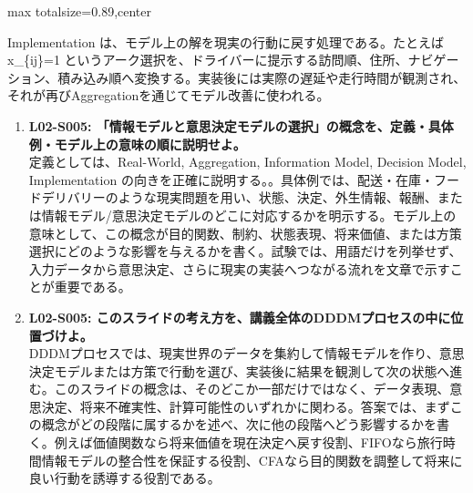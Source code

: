 \begin{minipage}[t]{0.58\textwidth}
\begin{adjustbox}{max totalsize={\textwidth}{0.89\textheight},center}
\begin{minipage}{\textwidth}
Implementation は、モデル上の解を現実の行動に戻す処理である。たとえば x\_\{ij\}=1 というアーク選択を、ドライバーに提示する訪問順、住所、ナビゲーション、積み込み順へ変換する。実装後には実際の遅延や走行時間が観測され、それが再びAggregationを通じてモデル改善に使われる。\par{}\begin{enumerate}\item \textbf{L02-S005: 「情報モデルと意思決定モデルの選択」の概念を、定義・具体例・モデル上の意味の順に説明せよ。}\\定義としては、Real-World, Aggregation, Information Model, Decision Model, Implementation の向きを正確に説明する。。具体例では、配送・在庫・フードデリバリーのような現実問題を用い、状態、決定、外生情報、報酬、または情報モデル/意思決定モデルのどこに対応するかを明示する。モデル上の意味として、この概念が目的関数、制約、状態表現、将来価値、または方策選択にどのような影響を与えるかを書く。試験では、用語だけを列挙せず、入力データから意思決定、さらに現実の実装へつながる流れを文章で示すことが重要である。\item \textbf{L02-S005: このスライドの考え方を、講義全体のDDDMプロセスの中に位置づけよ。}\\DDDMプロセスでは、現実世界のデータを集約して情報モデルを作り、意思決定モデルまたは方策で行動を選び、実装後に結果を観測して次の状態へ進む。このスライドの概念は、そのどこか一部だけではなく、データ表現、意思決定、将来不確実性、計算可能性のいずれかに関わる。答案では、まずこの概念がどの段階に属するかを述べ、次に他の段階へどう影響するかを書く。例えば価値関数なら将来価値を現在決定へ戻す役割、FIFOなら旅行時間情報モデルの整合性を保証する役割、CFAなら目的関数を調整して将来に良い行動を誘導する役割である。\end{enumerate}
\end{minipage}
\end{adjustbox}
\end{minipage}


